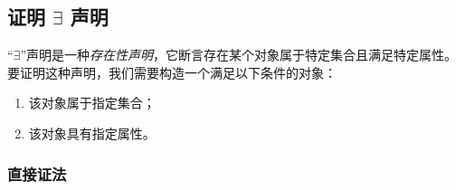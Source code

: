 \subsection{证明 $\exists$ 声明}\label{sec:section4.9.1}

``$\exists$''声明是一种\emph{存在性声明}，它断言存在某个对象属于特定集合且满足特定属性。要证明这种声明，我们需要构造一个满足以下条件的对象：
\begin{enumerate}[label=(\arabic*)]
    \item 该对象属于指定集合；
    \item 该对象具有指定属性。
\end{enumerate}

\subsubsection*{直接证法}

\setlength{\fboxrule}{2pt}
\setlength\fboxsep{5mm}
\begin{center}
\noindent {}
\end{center}


